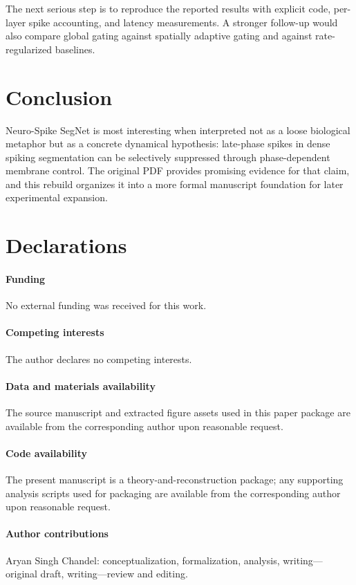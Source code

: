 \documentclass[11pt]{article}
\begin{document}
The next serious step is to reproduce the reported results with explicit code, per-layer spike accounting, and latency measurements. A stronger follow-up would also compare global gating against spatially adaptive gating and against rate-regularized baselines.

\section{Conclusion}
Neuro-Spike SegNet is most interesting when interpreted not as a loose biological metaphor but as a concrete dynamical hypothesis: late-phase spikes in dense spiking segmentation can be selectively suppressed through phase-dependent membrane control. The original PDF provides promising evidence for that claim, and this rebuild organizes it into a more formal manuscript foundation for later experimental expansion.

\section*{Declarations}
\paragraph{Funding} No external funding was received for this work.
\paragraph{Competing interests} The author declares no competing interests.
\paragraph{Data and materials availability} The source manuscript and extracted figure assets used in this paper package are available from the corresponding author upon reasonable request.
\paragraph{Code availability} The present manuscript is a theory-and-reconstruction package; any supporting analysis scripts used for packaging are available from the corresponding author upon reasonable request.
\paragraph{Author contributions} Aryan Singh Chandel: conceptualization, formalization, analysis, writing---original draft, writing---review and editing.



\end{document}
